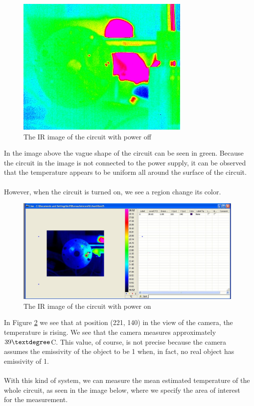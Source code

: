 \documentclass[english]{article}
\begin{document}
\begin{figure}[H]
	\centering
	\includegraphics[width=0.3\linewidth]{Pictures/circuit_cold001.JPG}
	\caption{The IR image of the circuit with power off}
	\label{fig:one}
\end{figure}
In the image above the vague shape of the circuit can be seen in green. 
Because the circuit in the image is not connected to the power supply, it can be observed that the temperature appears to be uniform all around the surface of the circuit.\\
\\
However, when the circuit is turned on, we see a region change its color.\\
\begin{figure}[H]
	\centering
	\includegraphics[width=1\linewidth]{Pictures/position1.JPG}
	\caption{The IR image of the circuit with power on}
	\label{fig:two}
\end{figure}
In Figure \ref{fig:two} we see that at position (221, 140) in the view of the camera, the temperature is rising.
We see that the camera measures approximately $39 \textdegree$C.
This value, of course, is not precise because the camera assumes the emissivity of the object to be 1 when, in fact, no real object has emissivity of 1.\\
\\
With this kind of system, we can measure the mean estimated temperature of the whole circuit, as seen in the image below, where we specify the area of interest for the measurement.\\
\end{document}
